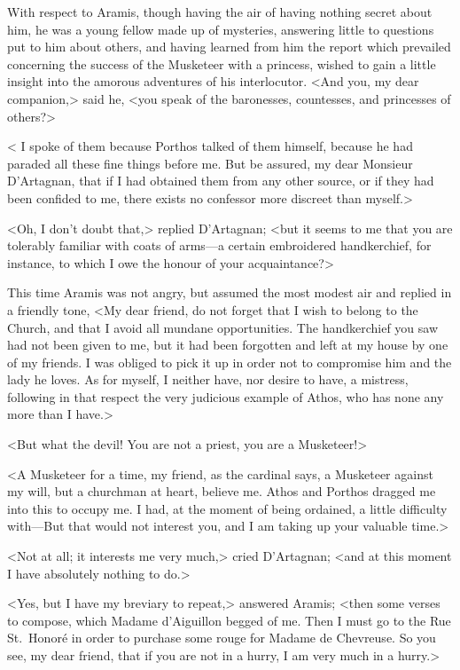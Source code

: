 With respect to Aramis, though having the air of having nothing secret about him, he was a young fellow made up of mysteries, answering little to questions put to him about others, and having learned from him the report which prevailed concerning the success of the Musketeer with a princess, wished to gain a little insight into the amorous adventures of his interlocutor. <And you, my dear companion,> said he, <you speak of the baronesses, countesses, and princesses of others?> 

< I spoke of them because Porthos talked of them himself, because he had paraded all these fine things before me. But be assured, my dear Monsieur D'Artagnan, that if I had obtained them from any other source, or if they had been confided to me, there exists no confessor more discreet than myself.> 

<Oh, I don't doubt that,> replied D'Artagnan; <but it seems to me that you are tolerably familiar with coats of arms—a certain embroidered handkerchief, for instance, to which I owe the honour of your acquaintance?> 

This time Aramis was not angry, but assumed the most modest air and replied in a friendly tone, <My dear friend, do not forget that I wish to belong to the Church, and that I avoid all mundane opportunities. The handkerchief you saw had not been given to me, but it had been forgotten and left at my house by one of my friends. I was obliged to pick it up in order not to compromise him and the lady he loves. As for myself, I neither have, nor desire to have, a mistress, following in that respect the very judicious example of Athos, who has none any more than I have.> 

<But what the devil! You are not a priest, you are a Musketeer!> 

<A Musketeer for a time, my friend, as the cardinal says, a Musketeer against my will, but a churchman at heart, believe me. Athos and Porthos dragged me into this to occupy me. I had, at the moment of being ordained, a little difficulty with—But that would not interest you, and I am taking up your valuable time.> 

<Not at all; it interests me very much,> cried D'Artagnan; <and at this moment I have absolutely nothing to do.> 

<Yes, but I have my breviary to repeat,> answered Aramis; <then some verses to compose, which Madame d'Aiguillon begged of me. Then I must go to the Rue St.~Honoré in order to purchase some rouge for Madame de Chevreuse. So you see, my dear friend, that if you are not in a hurry, I am very much in a hurry.> 

